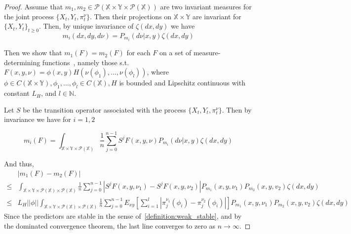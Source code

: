 \documentclass{article}
\begin{document}
\begin{proof}
    Assume that \( m_1,m_2 \in \mathcal{P}(\mathbb{X} \times \mathbb{Y} \times \mathcal{P}(\mathbb{X})) \) are two invariant measures for the joint process \( \{X_t,Y_t,\pi_t^\nu \} \). Then their projections on \( \mathbb{X} \times \mathbb{Y} \) are invariant for \( \{X_t, Y_t\}_{t\ge0} \). Then, by unique invariance of \( \zeta(dx,dy) \) we have %
    \[ m_i(dx,dy,d\nu) = P_{m_i}(d\nu | x,y)\zeta(dx,dy) \]

    Then we show that \( m_1(F) = m_2(F) \) for each \( F \) on a set of measure-determining functions~\cite{Stettner}, namely those s.t. \( F(x,y,\nu) = \phi(x,y)H(\nu(\phi_1),\ldots,\nu(\phi_l)) \), where \( \phi \in C(\mathbb{X} \times \mathbb{Y}), \phi_1,\ldots,\phi_l \in C(\mathbb{X}), H \) is bounded and Lipschitz continuous with constant \( L_H \), and \( l \in \mathbb{N} \).

    Let \( S \) be the transition operator associated with the process \( \{X_t,Y_t,\pi_t^\nu \} \). Then by invariance we have for \( i=1,2 \)

    \[ m_i(F) =  \int_{\mathbb{X} \times \mathbb{Y} \times \mathcal{P}(\mathbb{X})} \frac{1}{n}\sum_{j=0}^{n-1}S^j F(x,y,\nu)P_{m_i}(d\nu | x,y)\zeta(dx,dy) \]

    And thus,
    \begin{align*}
            & |m_1(F) - m_2(F)|                                                                                                                                                                                                                                             \\
        \le & \int_{\mathbb{X} \times \mathbb{Y} \times \mathcal{P}(\mathbb{X}) \times \mathcal{P}(\mathbb{X})} \frac{1}{n}\sum_{j=0}^{n-1} |S^j F(x,y,\nu_1) - S^j F(x,y,\nu_2)|P_{m_1}(x,y,\nu_1)P_{m_2}(x,y,v_2)\zeta(dx,dy)                                             \\
        \le & L_H ||\phi|| \int_{\mathbb{X} \times \mathbb{Y} \times \mathcal{P}(\mathbb{X}) \times \mathcal{P}(\mathbb{X})} \frac{1}{n}\sum_{j=0}^{n-1}E_{xy}[\sum_{i=1}^{l}|\pi_j^{\nu_1}(\phi_i) - \pi_j^{\nu_2}(\phi_i)|]P_{m_1}(x,y,\nu_1)P_{m_2}(x,y,v_2)\zeta(dx,dy)
    \end{align*}
    Since the predictors are stable in the sense of~\ref{definition:weak_stable}, and by the dominated convergence theorem, the last line converges to zero as \( n \to \infty \).
\end{proof}
\end{document}
